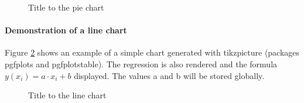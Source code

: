 \begin{figure}
	\centering
	\caption{\label{fig:PieChart}Title to the pie chart}
\end{figure}

\paragraph{Demonstration of a line chart}
Figure \ref{fig:LineChart} shows an example of a simple chart generated with tikzpicture (packages pgfplots and pgfplotstable). 
The regression is also rendered and the formula $ y(x_i) = a \cdot x_i + b$ displayed. The values a and b will be stored globally.

\begin{figure}
	\centering
	\caption{\label{fig:LineChart}Title to the line chart}
\end{figure}

